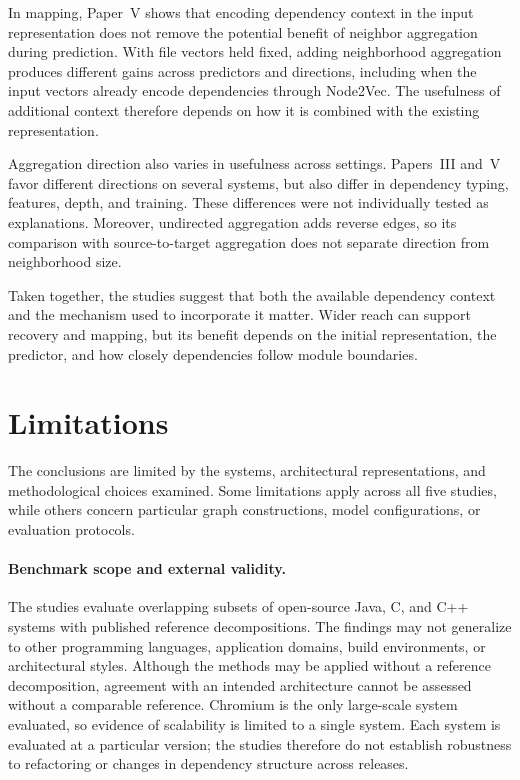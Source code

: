 In mapping, Paper~V shows that encoding dependency context in the input representation does not remove the potential benefit of neighbor aggregation during prediction. With file vectors held fixed, adding neighborhood aggregation produces different gains across predictors and directions, including when the input vectors already encode dependencies through Node2Vec. The usefulness of additional context therefore depends on how it is combined with the existing representation.

Aggregation direction also varies in usefulness across settings. Papers~III and~V favor different directions on several systems, but also differ in dependency typing, features, depth, and training. These differences were not individually tested as explanations. Moreover, undirected aggregation adds reverse edges, so its comparison with source-to-target aggregation does not separate direction from neighborhood size.

Taken together, the studies suggest that both the available dependency context and the mechanism used to incorporate it matter. Wider reach can support recovery and mapping, but its benefit depends on the initial representation, the predictor, and how closely dependencies follow module boundaries.

\section{Limitations \label{sec:limitations}}

The conclusions are limited by the systems, architectural representations, and methodological choices examined. Some limitations apply across all five studies, while others concern particular graph constructions, model configurations, or evaluation protocols.

\paragraph{Benchmark scope and external validity.}
The studies evaluate overlapping subsets of open-source Java, C, and C++ systems with published reference decompositions. The findings may not generalize to other programming languages, application domains, build environments, or architectural styles. Although the methods may be applied without a reference decomposition, agreement with an intended architecture cannot be assessed without a comparable reference. Chromium is the only large-scale system evaluated, so evidence of scalability is limited to a single system. Each system is evaluated at a particular version; the studies therefore do not establish robustness to refactoring or changes in dependency structure across releases.

